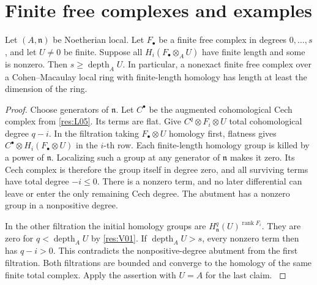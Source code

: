 \section{Finite free complexes and examples}

\begin{proposition}\label{res:I14}
Let \((A,\mathfrak n)\) be Noetherian local. Let \(F_\bullet\)
be a finite free complex in degrees \(0,\ldots,s\), and let
\(U\ne0\) be finite. Suppose all \(H_i(F_\bullet\otimes_A U)\)
have finite length and some is nonzero. Then
\(s\ge\operatorname{depth}_A U\). In particular, a nonexact
finite free complex over a Cohen--Macaulay local ring with
finite-length homology has length at least the dimension
of the ring.
\end{proposition}
\begin{proof}
Choose generators of \(\mathfrak n\). Let \(C^\bullet\) be
the augmented cohomological Cech complex from \ref{res:L05}.
Its terms are flat. Give \(C^q\otimes F_i\otimes U\) total
cohomological degree \(q-i\). In the filtration taking
\(F_\bullet\otimes U\) homology first, flatness gives
\(C^\bullet\otimes H_i(F_\bullet\otimes U)\) in the \(i\)-th
row. Each finite-length homology group is killed by a power
of \(\mathfrak n\). Localizing such a group at any generator of
\(\mathfrak n\) makes it zero. Its Cech complex is therefore
the group itself in degree zero, and all surviving terms
have total degree \(-i\le 0\). There is a nonzero term, and
no later differential can leave or enter the only remaining
Cech degree. The abutment has a nonzero group in a
nonpositive degree.

In the other filtration the initial homology groups are
\(H^q_{\mathfrak n}(U)^{\operatorname{rank}F_i}\). They are
zero for \(q<\operatorname{depth}_A U\) by \ref{res:V01}.
If \(\operatorname{depth}_A U>s\), every nonzero term then
has \(q-i>0\). This contradicts the nonpositive-degree
abutment from the first filtration. Both filtrations are
bounded and converge to the homology of the same finite
total complex. Apply the assertion with \(U=A\) for the
last claim. \cite[\S 9.4, Corollary 9.4.3]{bruns}
\end{proof}


